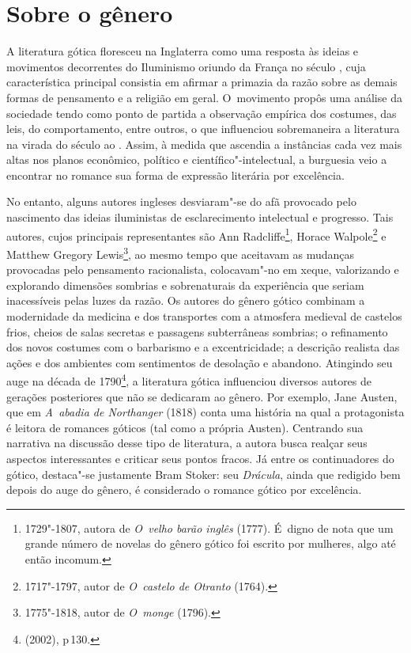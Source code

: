 \section{Sobre o gênero}

A literatura gótica floresceu na Inglaterra como uma resposta às ideias
e movimentos decorrentes do Iluminismo oriundo da França no século
, cuja característica principal consistia em afirmar a primazia da
razão sobre as demais formas de pensamento e a religião em geral. O~movimento propôs uma análise da sociedade tendo como ponto de partida a
observação empírica dos costumes, das leis, do comportamento, entre
outros, o que influenciou sobremaneira a literatura na virada do século
 ao . Assim, à medida que ascendia a instâncias cada vez mais
altas nos planos econômico, político e científico"-intelectual, a
burguesia veio a encontrar no romance sua forma de expressão literária
por excelência.

No entanto, alguns autores ingleses desviaram"-se do afã provocado pelo
nascimento das ideias iluministas de esclarecimento intelectual e
progresso. Tais autores, cujos principais representantes são Ann
Radcliffe\footnote{1729"-1807, autora de \emph{O~velho barão
inglês} (1777). É~digno de nota que um grande número de novelas do
gênero gótico foi escrito por mulheres, algo até então incomum.},
Horace Walpole\footnote{1717"-1797, autor de \emph{O~castelo de
Otranto} (1764).}
 e Matthew Gregory
 Lewis\footnote{1775"-1818, autor de \emph{O~monge} (1796).}, 
ao mesmo tempo que aceitavam as mudanças
provocadas pelo pensamento racionalista, colocavam"-no em xeque,
valorizando e explorando dimensões sombrias e sobrenaturais da
experiência que seriam inacessíveis pelas luzes da razão. Os autores
do gênero gótico combinam a modernidade da medicina e dos transportes
com a atmosfera medieval de castelos frios, cheios de salas secretas e
passagens subterrâneas sombrias; o refinamento dos novos costumes com o
barbarismo e a excentricidade; a descrição realista das ações e dos
ambientes com sentimentos de desolação e abandono. Atingindo seu auge na
década de 1790\footnote{ (2002), p\,130.}, a literatura gótica influenciou
diversos autores de gerações posteriores que não se dedicaram ao gênero.
Por exemplo, Jane Austen, que em \emph{A~abadia de Northanger} (1818)
conta uma história na qual a protagonista é leitora de romances góticos
(tal como a própria Austen). Centrando sua narrativa na discussão desse
tipo de literatura, a autora busca realçar seus aspectos interessantes e
criticar seus pontos fracos. Já entre os continuadores do gótico,
destaca"-se justamente Bram Stoker: seu \emph{Drácula}, ainda que
redigido bem depois do auge do gênero, é considerado o romance gótico
por excelência.

